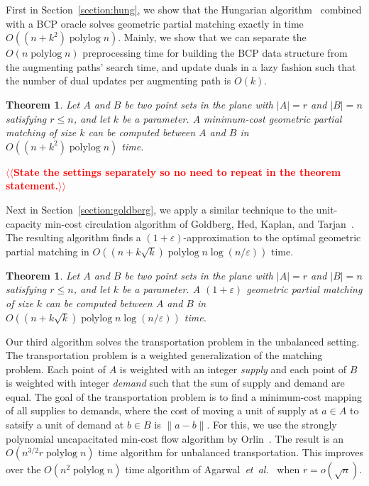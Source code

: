 \documentclass[11pt]{article}
\makeatletter
\def\etal{\textit{et~al.}}
\def\polylog{\mathop{\mathrm{polylog}}}
\def\eps{\varepsilon}
\theoremstyle{plain}
\newtheorem{theorem}[lemma]{Theorem}
\numberwithin{figure}{section}
\def\n@te#1{\textsf{\boldmath \textbf{$\langle\!\langle$#1$\rangle\!\rangle$}}\leavevmode}
\def\note#1{\textcolor{red}{\n@te{#1}}}
\makeatother
\begin{document}

First in Section~\ref{section:hung}, we show that the Hungarian
algorithm~\cite{Kuhn55} combined with a BCP oracle solves geometric partial
matching exactly in time $O((n + k^2)\polylog n)$.
Mainly, we show that we can separate the $O(n\polylog n)$ preprocessing time
for building the BCP data structure from the augmenting paths' search time,
and update duals in a lazy fashion such that the number of dual updates per
augmenting path is $O(k)$.

\begin{theorem}
\label{theorem:hung}
Let $A$ and $B$ be two point sets in the plane with $|A| = r$ and $|B| = n$ satisfying $r \le n$, and let $k$ be a
parameter.  A minimum-cost geometric partial matching of size $k$
can be computed between $A$ and $B$ in $O((n + k^2)\polylog n)$ time.
\end{theorem}

\note{State the settings separately so no need to repeat in the theorem statement.}


Next in Section~\ref{section:goldberg}, we apply a similar technique to the
unit-capacity min-cost circulation algorithm of Goldberg, Hed, Kaplan, and
Tarjan~\cite{GHKT17}.
The resulting algorithm finds a $(1 + \eps)$-approximation to the optimal
geometric partial matching in $O((n + k\sqrt{k})\polylog n \log(n/\eps))$ time.

\begin{theorem}
\label{theorem:gmcm}
Let $A$ and $B$ be two point sets in the plane with $|A| = r$ and $|B| = n$
satisfying $r \le n$, and let $k$ be a parameter.
A $(1+\eps)$ geometric partial matching of size $k$ can be computed between
$A$ and $B$ in $O((n + k\sqrt{k})\polylog n \log(n/\eps))$ time.
\end{theorem}


Our third algorithm solves the transportation problem in the unbalanced
setting.
The transportation problem is a weighted generalization of the matching
problem.
Each point of $A$ is weighted with an integer \emph{supply} and each point of
$B$ is weighted with integer \emph{demand} such that the sum of supply and
demand are equal.
The goal of the transportation problem is to find a minimum-cost mapping of
all supplies to demands, where the cost of moving a unit of supply at $a \in A$
to satsify a unit of demand at $b \in B$ is $\|a - b\|$.
For this, we use the strongly polynomial uncapacitated min-cost flow algorithm
by Orlin~\cite{O93}.
The result is an $O(n^{3/2} r \polylog n)$ time algorithm for unbalanced
transportation.
This improves over the $O(n^2 \polylog n)$ time algorithm of
Agarwal~\etal~\cite{AFPVX17} when $r = o(\sqrt{n})$.
\end{document}
